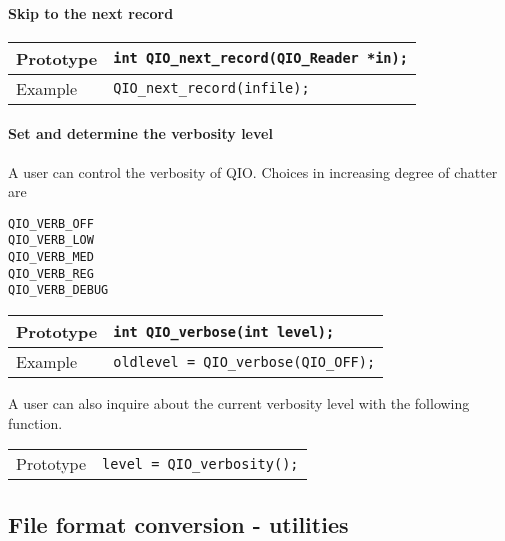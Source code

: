 \documentclass{article}
\begin{document}
\paragraph{Skip to the next record}

\begin{flushleft}
  \begin{tabular}{|l|l|}
  \hline
  Prototype      & \verb|int QIO_next_record(QIO_Reader *in);| \\
\hline
  Example  & \verb|QIO_next_record(infile);|\\
   \hline
 \end{tabular}
\end{flushleft}
%

\paragraph{Set and determine the verbosity level}

A user can control the verbosity of QIO\@.  Choices in increasing
degree of chatter are
%
\begin{verbatim}
QIO_VERB_OFF   
QIO_VERB_LOW   
QIO_VERB_MED   
QIO_VERB_REG   
QIO_VERB_DEBUG 
\end{verbatim}
%
\begin{flushleft}
  \begin{tabular}{|l|l|}
  \hline
  Prototype      & \verb|int QIO_verbose(int level);| \\
\hline
  Example  & \verb|oldlevel = QIO_verbose(QIO_OFF);|\\
   \hline
 \end{tabular}
\end{flushleft}
%

A user can also inquire about the current verbosity level with the
following function.

%
\begin{flushleft}
  \begin{tabular}{|l|l|}
  \hline
  Prototype      & \verb|level = QIO_verbosity();| \\
 \end{tabular}
\end{flushleft}
%


\subsection{File format conversion - utilities}
\end{document}
